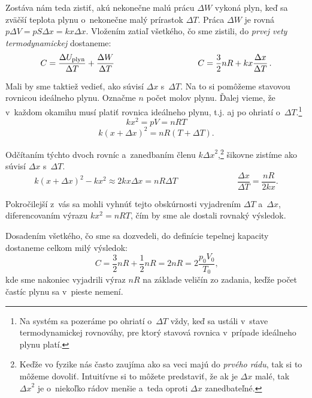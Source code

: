 Zostáva nám teda zistiť, akú nekonečne malú prácu $\Delta W$ vykoná plyn, keď sa zväčší teplota plynu o~nekonečne malý 
prírastok $\Delta T$. Práca $\Delta W$ je rovná $p\Delta V = pS\Delta x = kx\Delta x$. Vložením zatiaľ všetkého, čo sme zistili, do 
\emph{prvej vety termodynamickej} dostaneme:
$$C = \frac{\Delta U_{\text{plyn}}}{\Delta T} + \frac{\Delta W}{\Delta T} \hspace{3.5cm}
C = \frac{3}{2}nR + kx\frac{\Delta x}{\Delta T} \,\text{.}$$

Mali by sme taktiež vedieť, ako súvisí $\Delta x$ s~$\Delta T$. Na to si pomôžeme stavovou rovnicou ideálneho plynu. Označme $n$ počet 
molov plynu. Ďalej vieme, že v~každom okamihu musí platiť rovnica ideálneho plynu, t.j. aj po ohriatí o~$\Delta T$.\footnote{Na 
systém sa pozeráme po ohriatí o~$\Delta T$ vždy, keď sa ustáli v~stave termodynamickej rovnováhy, pre ktorý stavová rovnica
v~prípade ideálneho plynu platí.}
$$kx^2  = pV = nRT $$
$$k{\left(x+\Delta x\right)}^2 = nR\left(T+\Delta T\right)\text{.}$$

Odčítaním týchto dvoch rovníc a~zanedbaním členu $k{\Delta x}^2$,\footnote{Keďže vo fyzike nás často zaujíma ako sa veci majú 
do \emph{prvého rádu}, tak si to môžeme dovoliť. Intuitívne si to môžete predstaviť, že ak je $\Delta x$ malé, tak ${\Delta x}^2$ 
je o~niekoľko rádov menšie a~teda oproti $\Delta x$ zanedbateľné.} šikovne zistíme ako súvisí $\Delta x$ s~$\Delta T$.
$$k{\left(x+\Delta x\right)}^2 - kx^2 \approx 2kx\Delta x = nR\Delta T \hspace{3cm}
\frac{\Delta x}{\Delta T} = \frac{nR}{2kx}\text{.}$$

Pokročilejší z~vás sa mohli vyhnúť tejto obskúrnosti vyjadrením $\Delta T$ a~$\Delta x$, diferencovaním výrazu $kx^2 = nRT$,
čím by sme ale dostali rovnaký výsledok.

Dosadením všetkého, čo sme sa dozvedeli, do definície tepelnej kapacity dostaneme celkom milý výsledok:
$$C = \frac{3}{2}nR + \frac{1}{2}nR = 2nR = 2\frac{p_0 V_0}{T_0} \text{,}$$
kde sme nakoniec vyjadrili výraz $nR$ na základe veličín zo zadania, keďže počet častíc plynu sa v~pieste nemení.
